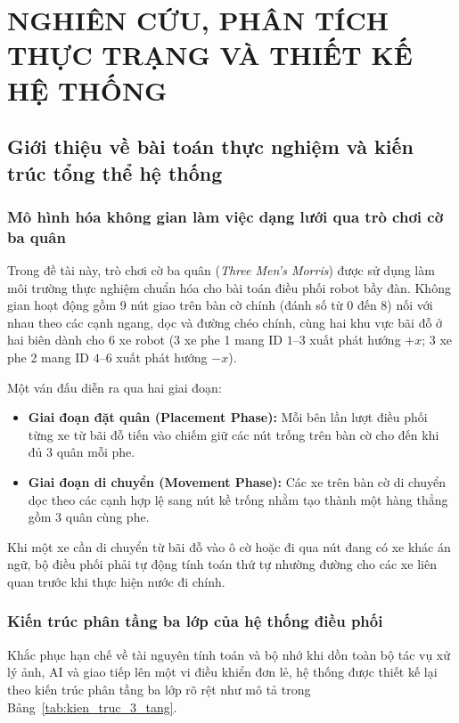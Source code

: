 \documentclass[12pt,a4paper]{report}
\begin{document}
	\clearpage
	\chapter{NGHIÊN CỨU, PHÂN TÍCH THỰC TRẠNG VÀ THIẾT KẾ HỆ THỐNG}
	
	\section{Giới thiệu về bài toán thực nghiệm và kiến trúc tổng thể hệ thống}
	
	\subsection{Mô hình hóa không gian làm việc dạng lưới qua trò chơi cờ ba quân}
	Trong đề tài này, trò chơi cờ ba quân (\textit{Three Men's Morris}) được sử dụng làm môi trường thực nghiệm chuẩn hóa cho bài toán điều phối robot bầy đàn. Không gian hoạt động gồm 9 nút giao trên bàn cờ chính (đánh số từ $0$ đến $8$) nối với nhau theo các cạnh ngang, dọc và đường chéo chính, cùng hai khu vực bãi đỗ ở hai biên dành cho 6 xe robot (3 xe phe 1 mang ID $1$--$3$ xuất phát hướng $+x$; 3 xe phe 2 mang ID $4$--$6$ xuất phát hướng $-x$).
	
	Một ván đấu diễn ra qua hai giai đoạn:
	\begin{itemize}[leftmargin=1.2cm]
		\item \textbf{Giai đoạn đặt quân (Placement Phase):} Mỗi bên lần lượt điều phối từng xe từ bãi đỗ tiến vào chiếm giữ các nút trống trên bàn cờ cho đến khi đủ 3 quân mỗi phe.
		\item \textbf{Giai đoạn di chuyển (Movement Phase):} Các xe trên bàn cờ di chuyển dọc theo các cạnh hợp lệ sang nút kề trống nhằm tạo thành một hàng thẳng gồm 3 quân cùng phe.
	\end{itemize}
	Khi một xe cần di chuyển từ bãi đỗ vào ô cờ hoặc đi qua nút đang có xe khác án ngữ, bộ điều phối phải tự động tính toán thứ tự nhường đường cho các xe liên quan trước khi thực hiện nước đi chính.
	
	\subsection{Kiến trúc phân tầng ba lớp của hệ thống điều phối}
	Khắc phục hạn chế về tài nguyên tính toán và bộ nhớ khi dồn toàn bộ tác vụ xử lý ảnh, AI và giao tiếp lên một vi điều khiển đơn lẻ, hệ thống được thiết kế lại theo kiến trúc phân tầng ba lớp rõ rệt như mô tả trong Bảng~\ref{tab:kien_truc_3_tang}.
	
\end{document}
